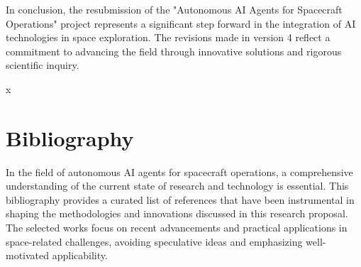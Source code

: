 \documentclass[a4paper,12pt]{article}
\begin{document}
In conclusion, the resubmission of the "Autonomous AI Agents for Spacecraft Operations" project represents a significant step forward in the integration of AI technologies in space exploration. The revisions made in version 4 reflect a commitment to advancing the field through innovative solutions and rigorous scientific inquiry.



x
\section{Bibliography}

In the field of autonomous AI agents for spacecraft operations, a comprehensive understanding of the current state of research and technology is essential. This bibliography provides a curated list of references that have been instrumental in shaping the methodologies and innovations discussed in this research proposal. The selected works focus on recent advancements and practical applications in space-related challenges, avoiding speculative ideas and emphasizing well-motivated applicability.
\end{document}
